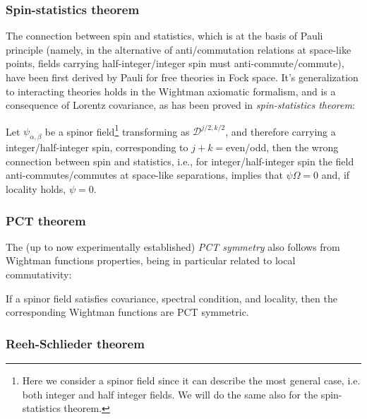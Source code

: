 \documentclass[../main/main.tex]{subfiles}
\begin{document}
\subsubsection{Spin-statistics theorem}

The connection between spin and statistics, which is at the basis of Pauli principle (namely, in the alternative of anti/commutation relations at space-like points, fields carrying half-integer/integer spin must anti-commute/commute), have been first derived by Pauli for free theories in Fock space. It's generalization to interacting theories holds in the Wightman axiomatic formalism, and is a consequence of Lorentz covariance, as has been proved in \emph{spin-statistics theorem}:
\begin{theorem}
	Let $\psi_{\alpha,\dot\beta}$ be a spinor field\footnote{Here we consider a spinor field since it can describe the most general case, i.e. both integer and half integer fields. We will do the same also for the spin-statistics theorem.} transforming as $\mathcal D^{j/2,k/2}$, and therefore carrying a integer/half-integer spin, corresponding to $j+k=$even/odd, then the wrong connection between spin and statistics, i.e., for integer/half-integer spin the field anti-commutes/commutes at space-like separations, implies that $\psi\Omega=0$ and, if locality holds, $\psi=0$.
\end{theorem}

\subsubsection{PCT theorem}

The (up to now experimentally established) \emph{PCT symmetry} also follows from Wightman functions properties, being in particular related to local commutativity:
\begin{theorem}
	If a spinor field satisfies covariance, spectral condition, and locality, then the corresponding Wightman functions are PCT symmetric.
\end{theorem}

\subsubsection{Reeh-Schlieder theorem}
\end{document}
